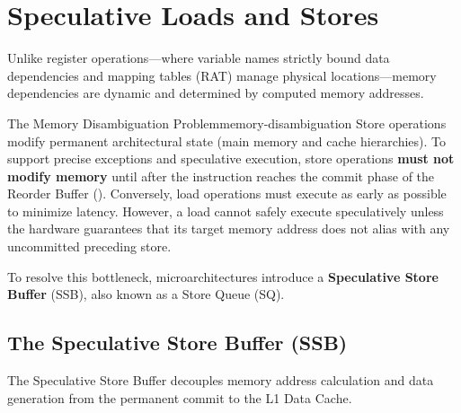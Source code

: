 \section{Speculative Loads and Stores}
\label{sec:speculative_load_stores}

Unlike register operations—where variable names strictly bound data dependencies and mapping tables (RAT) manage physical locations—memory dependencies are dynamic and determined by computed memory addresses.

\begin{concept}{The Memory Disambiguation Problem}{memory-disambiguation}
Store operations modify permanent architectural state (main memory and cache hierarchies). To support precise exceptions and speculative execution, store operations \textbf{must not modify memory} until after the instruction reaches the commit phase of the Reorder Buffer (). 
Conversely, load operations must execute as early as possible to minimize latency. However, a load cannot safely execute speculatively unless the hardware guarantees that its target memory address does not alias with any uncommitted preceding store.
\end{concept}

To resolve this bottleneck, microarchitectures introduce a \textbf{Speculative Store Buffer} (SSB), also known as a Store Queue (SQ).

\subsection{The Speculative Store Buffer (SSB)}

The Speculative Store Buffer decouples memory address calculation and data generation from the permanent commit to the L1 Data Cache.

